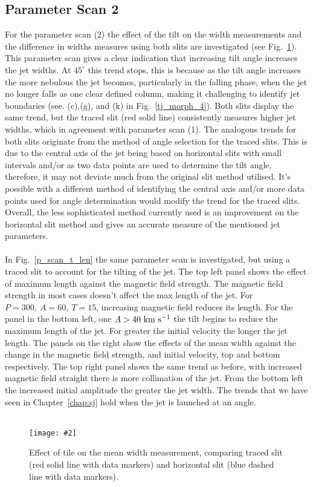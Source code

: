 \documentclass[12pt]{ociamthesis}
\newcommand{\mfig}[4]{
  \begin{figure}
  \begin{center}
  \texttt{[image: \#2]}
  \caption{#3}
  \label{#4}
  \end{center}
  \end{figure}}
\newcommand{\kms}{~\rm{km ~s^{-1}}}
\newcommand{\np}{\\ \\}
\begin{document}
\subsection{Parameter Scan 2}
\label{subsec:pscansII_I}
For the parameter scan (2) the effect of the tilt on the width measurements and the difference in widths measures using both slits are investigated (see Fig.~\ref{width_measure}). This parameter scan gives a clear indication that increasing tilt angle increases the jet widths. At $45^{\circ}$ this trend stops, this is because as the tilt angle increases the more nebulous the jet becomes, particularly in the falling phase, when the jet no longer falls as one clear defined column, making it challenging to identify jet boundaries (see. (c),(g), and (k) in Fig.~\ref{tj_morph_4}). Both slits display the same trend, but the traced slit (red solid line) consistently measures higher jet widths, which in agreement with parameter scan (1). The analogous trends for both slits originate from the method of angle selection for the traced slits. This is due to the central axis of the jet being based on horizontal slits with small intervals and/or as two data points are used to determine the tilt angle, therefore, it may not deviate much from the original slit method utilised. It's possible with a different method of identifying the central axis and/or more data points used for angle determination would modify the trend for the traced slits. Overall, the less sophisticated method currently used is an improvement on the horizontal slit method and gives an accurate measure of the mentioned jet parameters. \np
%
In Fig.~\ref{p_scan_t_len} the same parameter scan is investigated, but using a traced slit to account for the tilting of the jet. The top left panel shows the effect of maximum length against the magnetic field strength. The magnetic field strength in most cases doesn’t affect the max length of the jet. For $P=300,~A=60,~T=15$, increasing magnetic field reduces its length. For the panel in the bottom left, one $A>40 \kms$  the tilt begins to reduce the maximum length of the jet. For greater the initial velocity the longer the jet length. The panels on the right show the effects of the mean width against the change in the magnetic field strength, and initial velocity, top and bottom respectively. The top right panel shows the same trend as before, with increased magnetic field straight there is more collimation of the jet. From the bottom left the increased initial amplitude the greater the jet width. The trends that we have seen in Chapter~\ref{chap:sj} hold when the jet is launched at an angle.  \np
\mfig{1}{figures/mean_w_vs_tilt.png}{Effect of tile on the mean width measurement, comparing traced slit (red solid line with data markers) and horizontal slit (blue dashed line with data markers).}{width_measure}
\end{document}
